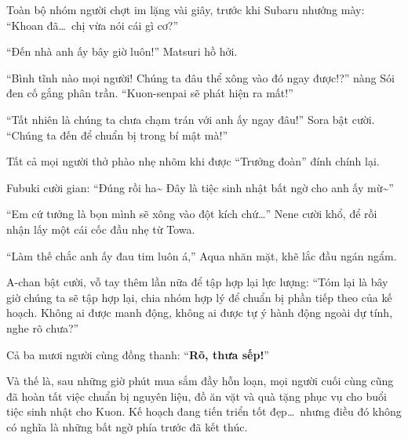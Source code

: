 \documentclass[../main.tex]{subfiles}
\begin{document}
Toàn bộ nhóm người chợt im lặng vài giây, trước khi Subaru nhướng mày: ``Khoan đã\dots\ chị vừa nói cái gì cơ?''

``Đến nhà anh ấy bây giờ luôn!''  Matsuri hồ hởi.

``Bình tĩnh nào mọi người! Chúng ta đâu thể xông vào đó ngay được!?'' nàng Sói đen cố gắng phân trần. ``Kuon-senpai sẽ phát hiện ra mất!''

``Tất nhiên là chúng ta chưa chạm trán với anh ấy ngay đâu!'' Sora bật cười. ``Chúng ta đến để chuẩn bị trong bí mật mà!''

Tất cả mọi người thở phào nhẹ nhõm khi được ``Trưởng đoàn'' đính chính lại.

Fubuki cười gian: ``Đúng rồi ha\~{} Đây là tiệc sinh nhật bất ngờ cho anh ấy mừ\~{}''

``Em cứ tưởng là bọn mình sẽ xông vào đột kích chứ\dots'' Nene cười khổ, để rồi nhận lấy một cái cốc đầu nhẹ từ Towa.

``Làm thế chắc anh ấy đau tim luôn á,'' Aqua nhăn mặt, khẽ lắc đầu ngán ngẩm.

A-chan bật cười, vỗ tay thêm lần nữa để tập hợp lại lực lượng: ``Tóm lại là bây giờ chúng ta sẽ tập hợp lại, chia nhóm hợp lý để chuẩn bị phần tiếp theo của kế hoạch. Không ai được manh động, không ai được tự ý hành động ngoài dự tính, nghe rõ chưa?''

Cả ba mươi người cùng đồng thanh: ``\textbf{Rõ, thưa sếp!}''

Và thế là, sau những giờ phút mua sắm đầy hỗn loạn, mọi người cuối cùng cũng đã hoàn tất việc chuẩn bị nguyên liệu, đồ ăn vặt và quà tặng phục vụ cho buổi tiệc sinh nhật cho Kuon. Kế hoạch đang tiến triển tốt đẹp\dots\ nhưng điều đó không có nghĩa là những bất ngờ phía trước đã kết thúc.
\end{document}
